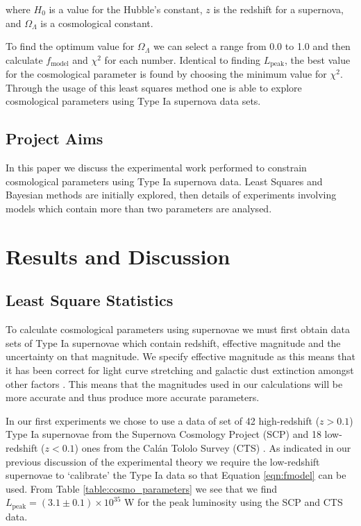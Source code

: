 \documentclass[twocolumn]{revtex4}
\begin{document}
where $H_0$ is a value for the Hubble's constant, $z$ is the redshift for a supernova, and $\Omega_\Lambda$ is a cosmological constant.

To find the optimum value for $\Omega_\Lambda$ we can select a range from 0.0 to 1.0 and then calculate $f_\text{model}$ and $\chi^2$ for each number. Identical to finding $L_\text{peak}$, the best value for the cosmological parameter is found by choosing the minimum value for $\chi^2$. Through the usage of this least squares method one is able to explore cosmological parameters using Type Ia supernova data sets.

\vspace{-4ex}
\subsection{Project Aims}
\vspace{-2ex}
In this paper we discuss the experimental work performed to constrain cosmological parameters using Type Ia supernova data. Least Squares and Bayesian methods are initially explored, then details of experiments involving models which contain more than two parameters are analysed.

\vspace{-3ex}
\section{Results and Discussion} 
\label{sec:results_discussion}
\vspace{-3ex}
\subsection{Least Square Statistics} 
\vspace{-2ex}
To calculate cosmological parameters using supernovae we must first obtain data sets of Type Ia supernovae which contain redshift, effective magnitude and the uncertainty on that magnitude. We specify effective magnitude as this means that it has been correct for light curve stretching and galactic dust extinction amongst other factors \cite{script}. This means that the magnitudes used in our calculations will be more accurate and thus produce more accurate parameters. 

In our first experiments we chose to use a data of set of 42 high-redshift ($z>0.1$) Type Ia supernovae from the Supernova Cosmology Project (SCP) and 18 low-redshift ($z<0.1$) ones from the Cal\'{a}n Tololo Survey (CTS) \cite{dataset_1}. As indicated in our previous discussion of the experimental theory we require the low-redshift supernovae to `calibrate' the Type Ia data so that Equation \ref{eqn:fmodel} can be used. From Table \ref{table:cosmo_parameters} we see that we find $L_{\text{peak}} = (3.1\pm0.1) \times 10^{35}$ W for the peak luminosity using the SCP and CTS data.
\end{document}
